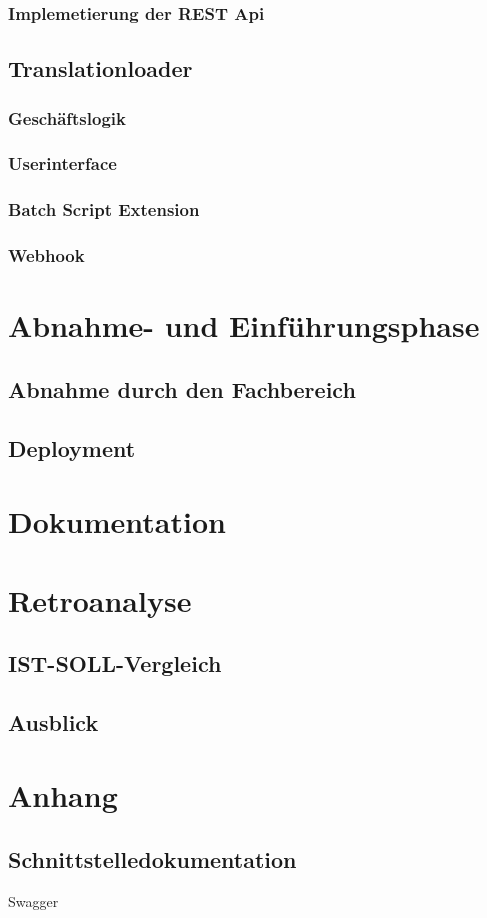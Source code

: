 \documentclass[oneside]{article}
\begin{document}
  \subsubsection{Implemetierung der REST Api}
  \subsection{Translationloader}
  \subsubsection{Geschäftslogik}
  \subsubsection{Userinterface}
  \subsubsection{Batch Script Extension}
  \subsubsection{Webhook}
  \section{Abnahme- und Einführungsphase}
  \subsection{Abnahme durch den Fachbereich}
  \subsection{Deployment}
  \section{Dokumentation}
  \section{Retroanalyse}
  \subsection{IST-SOLL-Vergleich}
  \subsection{Ausblick}
  \setcounter{section}{0}
  \renewcommand{\thesection}{\MakeUppercase{\alph{section}}}
  \section{Anhang}
  \subsection{Schnittstelledokumentation}
  Swagger
\end{document}

